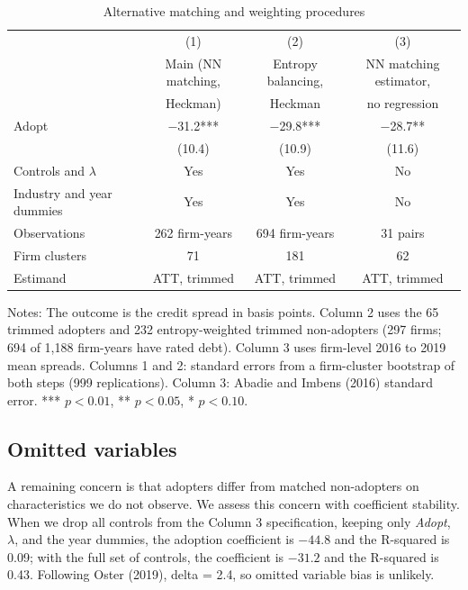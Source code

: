 \documentclass[11pt]{article}
\begin{document}
\begin{table}[!htbp]
\centering
\begin{threeparttable}
\caption{Alternative matching and weighting procedures}
\label{tab:robust}
\small
\begin{tabular}{lccc}
\toprule
 & (1) & (2) & (3) \\
 & Main (NN matching, & Entropy balancing, & NN matching estimator, \\
 & Heckman) & Heckman & no regression \\
\midrule
Adopt & $-$31.2*** & $-$29.8*** & $-$28.7** \\
 & (10.4) & (10.9) & (11.6) \\
Controls and $\lambda$ & Yes & Yes & No \\
Industry and year dummies & Yes & Yes & No \\
\midrule
Observations & 262 firm-years & 694 firm-years & 31 pairs \\
Firm clusters & 71 & 181 & 62 \\
Estimand & ATT, trimmed & ATT, trimmed & ATT, trimmed \\
\bottomrule
\end{tabular}
\begin{tablenotes}\footnotesize
\item Notes: The outcome is the credit spread in basis points. Column 2 uses the 65 trimmed adopters and 232 entropy-weighted trimmed non-adopters (297 firms; 694 of 1,188 firm-years have rated debt). Column 3 uses firm-level 2016 to 2019 mean spreads. Columns 1 and 2: standard errors from a firm-cluster bootstrap of both steps (999 replications). Column 3: Abadie and Imbens (2016) standard error. *** $p<0.01$, ** $p<0.05$, * $p<0.10$.
\end{tablenotes}
\end{threeparttable}
\end{table}

\subsection{Omitted variables}

A remaining concern is that adopters differ from matched non-adopters on characteristics we do not observe. We assess this concern with coefficient stability. When we drop all controls from the Column 3 specification, keeping only \textit{Adopt}, $\lambda$, and the year dummies, the adoption coefficient is $-44.8$ and the R-squared is 0.09; with the full set of controls, the coefficient is $-31.2$ and the R-squared is 0.43. Following Oster (2019), delta = 2.4, so omitted variable bias is unlikely.
\end{document}
